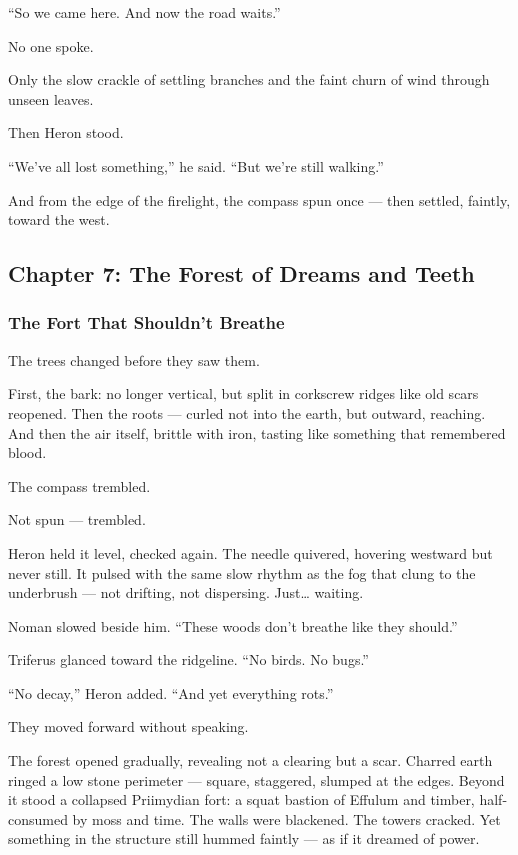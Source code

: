 \documentclass[12pt]{article}
\begin{document}
“So we came here. And now the road waits.”

\vspace{1em}

No one spoke.

Only the slow crackle of settling branches and the faint churn of wind through unseen leaves.

Then Heron stood.

“We’ve all lost something,” he said. “But we’re still walking.”

\vspace{1em}

And from the edge of the firelight, the compass spun once — then settled, faintly, toward the west.

\newpage

\subsection{Chapter 7: The Forest of Dreams and Teeth}

\vspace{.5in}

\subsubsection{The Fort That Shouldn’t Breathe}

The trees changed before they saw them.

First, the bark: no longer vertical, but split in corkscrew ridges like old scars reopened. Then the roots — curled not into the earth, but outward, reaching. And then the air itself, brittle with iron, tasting like something that remembered blood.

The compass trembled.

Not spun — trembled.

Heron held it level, checked again. The needle quivered, hovering westward but never still. It pulsed with the same slow rhythm as the fog that clung to the underbrush — not drifting, not dispersing. Just… waiting.

Noman slowed beside him. “These woods don’t breathe like they should.”

Triferus glanced toward the ridgeline. “No birds. No bugs.”

“No decay,” Heron added. “And yet everything rots.”

They moved forward without speaking.

The forest opened gradually, revealing not a clearing but a scar. Charred earth ringed a low stone perimeter — square, staggered, slumped at the edges. Beyond it stood a collapsed Priimydian fort: a squat bastion of Effulum and timber, half-consumed by moss and time. The walls were blackened. The towers cracked. Yet something in the structure still hummed faintly — as if it dreamed of power.
\end{document}
